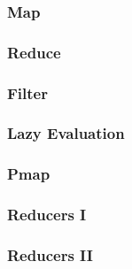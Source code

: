 \documentclass{beamer}
\begin{document}
\begin{frame}[fragile]
\frametitle{Map}
\end{frame}

\begin{frame}[fragile]
\frametitle{Reduce}
\end{frame}

\begin{frame}[fragile]
\frametitle{Filter}
\end{frame}

\begin{frame}[fragile]
\frametitle{Lazy Evaluation}
\end{frame}

\begin{frame}[fragile]
\frametitle{Pmap}
\end{frame}

\begin{frame}[fragile]
\frametitle{Reducers I}
\end{frame}

\begin{frame}[fragile]
\frametitle{Reducers II}
\end{frame}
\end{document}
